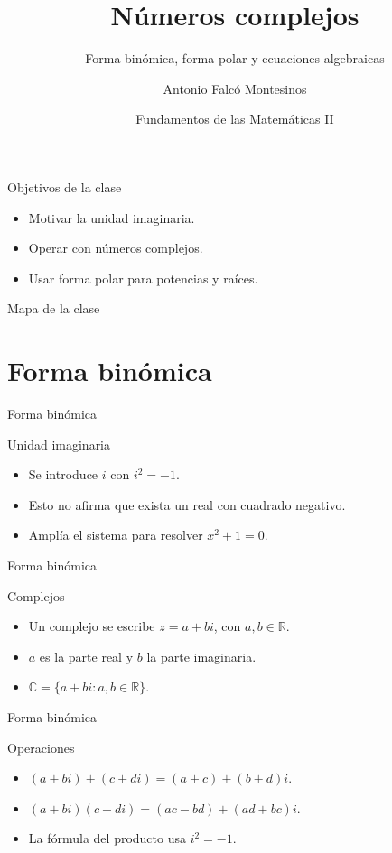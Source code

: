 \documentclass[aspectratio=169,11pt]{beamer}
\title[FdM II -- Clase 15]{Números complejos}
\subtitle{Forma binómica, forma polar y ecuaciones algebraicas}
\author{Antonio Falcó Montesinos}
\institute{Universidad CEU Cardenal Herrera}
\date{Fundamentos de las Matemáticas II}
\begin{document}
\begin{frame}
  \titlepage
\end{frame}

\begin{frame}{Objetivos de la clase}
\begin{itemize}
  \item Motivar la unidad imaginaria.
  \item Operar con números complejos.
  \item Usar forma polar para potencias y raíces.
\end{itemize}
\end{frame}

\begin{frame}{Mapa de la clase}
\tableofcontents
\end{frame}

\section{Forma binómica}

\begin{frame}{Forma binómica}
\begin{block}{Unidad imaginaria}
\begin{itemize}
  \item Se introduce \(i\) con \(i^2=-1\).
  \item Esto no afirma que exista un real con cuadrado negativo.
  \item Amplía el sistema para resolver \(x^2+1=0\).
\end{itemize}
\end{block}
\end{frame}

\begin{frame}{Forma binómica}
\begin{block}{Complejos}
\begin{itemize}
  \item Un complejo se escribe \(z=a+bi\), con \(a,b\in\mathbb{R}\).
  \item \(a\) es la parte real y \(b\) la parte imaginaria.
  \item \(\mathbb{C}=\{a+bi:a,b\in\mathbb{R}\}\).
\end{itemize}
\end{block}
\end{frame}

\begin{frame}{Forma binómica}
\begin{block}{Operaciones}
\begin{itemize}
  \item \((a+bi)+(c+di)=(a+c)+(b+d)i\).
  \item \((a+bi)(c+di)=(ac-bd)+(ad+bc)i\).
  \item La fórmula del producto usa \(i^2=-1\).
\end{itemize}
\end{block}
\end{frame}
\end{document}
